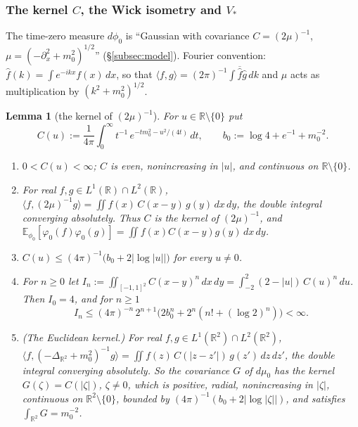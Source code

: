\documentclass[11pt,a4paper]{article}
\theoremstyle{plain}
\theoremstyle{definition}
\theoremstyle{plain}
\newtheorem{auxlemma}{Lemma}
\theoremstyle{definition}
\newcommand{\R}{\mathbb{R}}
\newcommand{\E}{\mathbb{E}}
\newcommand{\ip}[2]{\langle #1,#2\rangle}
\newcommand{\dmu}{d\mu_0}
\newcommand{\dphi}{d\phi_0}
\begin{document}
\subsubsection{The kernel $C$, the Wick isometry and $V_*$}\label{sec:notation-wick}

The time-zero measure $\dphi$ is ``Gaussian with covariance $C=(2\mu)^{-1}$,
$\mu=(-\partial_x^2+m_0^2)^{1/2}$'' (\S\ref{subsec:model}).  Fourier convention:
$\hat f(k)=\int e^{-ikx}f(x)\,dx$, so that $\ip fg=(2\pi)^{-1}\int\overline{\hat f}\hat g\,dk$
and $\mu$ acts as multiplication by $(k^2+m_0^2)^{1/2}$.

\begin{auxlemma}[the kernel of $(2\mu)^{-1}$]\label{aux:notation-kernel}
For $u\in\R\setminus\{0\}$ put
\[
 C(u):=\frac1{4\pi}\int_0^\infty t^{-1}\,e^{-tm_0^2-u^2/(4t)}\,dt ,\qquad
 b_0:=\log4+e^{-1}+m_0^{-2} .
\]
\begin{enumerate}
\item[\textup{(i)}] $0<C(u)<\infty$; $C$ is even, nonincreasing in $|u|$, and continuous on
$\R\setminus\{0\}$.
\item[\textup{(ii)}] For real $f,g\in L^1(\R)\cap L^2(\R)$, $\ip f{(2\mu)^{-1}g}=\iint
f(x)\,C(x-y)\,g(y)\,dx\,dy$, the double integral converging absolutely.  Thus $C$ is the
kernel of $(2\mu)^{-1}$, and $\E_{\phi_0}[\varphi_0(f)\varphi_0(g)]=\iint f(x)C(x-y)g(y)\,dx\,dy$.
\item[\textup{(iii)}] $C(u)\le(4\pi)^{-1}\bigl(b_0+2|\log|u||\bigr)$ for every $u\ne0$.
\item[\textup{(iv)}] For $n\ge0$ let $I_n:=\iint_{[-1,1]^2}C(x-y)^n\,dx\,dy=\int_{-2}^2(2-|u|)\,
C(u)^n\,du$.  Then $I_0=4$, and for $n\ge1$
\[
 I_n\le(4\pi)^{-n}\,2^{n+1}\bigl(2b_0^n+2^n(n!+(\log2)^n)\bigr)<\infty .
\]
\item[\textup{(v)}] \textup{(The Euclidean kernel.)}  For real $f,g\in L^1(\R^2)\cap L^2(\R^2)$,
$\ip f{(-\Delta_{\R^2}+m_0^2)^{-1}g}=\iint f(z)\,C(|z-z'|)\,g(z')\,dz\,dz'$, the double integral
converging absolutely.  So the covariance $G$ of $\dmu$ has the kernel $G(\zeta)=C(|\zeta|)$,
$\zeta\ne0$, which is positive, radial, nonincreasing in $|\zeta|$, continuous on
$\R^2\setminus\{0\}$, bounded by $(4\pi)^{-1}(b_0+2|\log|\zeta||)$, and satisfies
$\int_{\R^2}G=m_0^{-2}$.
\end{enumerate}
\end{auxlemma}
\end{document}
